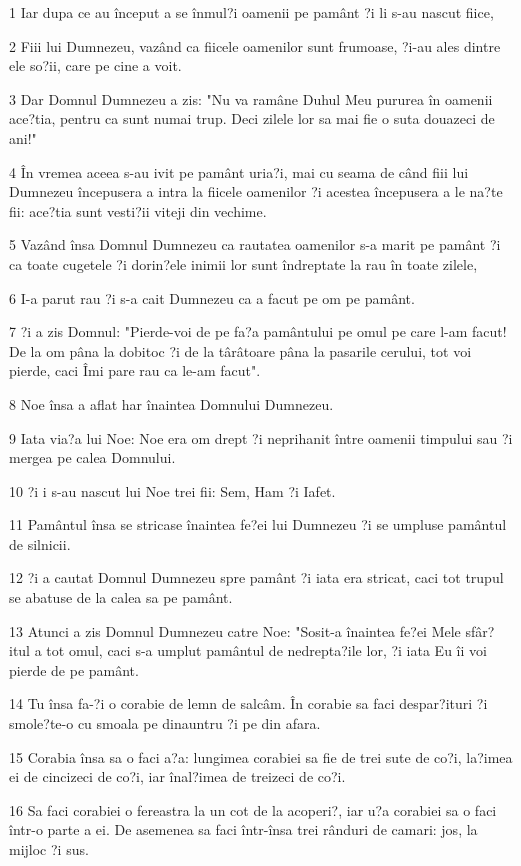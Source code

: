 \par 1 Iar dupa ce au început a se înmul?i oamenii pe pamânt ?i li s-au nascut fiice,
\par 2 Fiii lui Dumnezeu, vazând ca fiicele oamenilor sunt frumoase, ?i-au ales dintre ele so?ii, care pe cine a voit.
\par 3 Dar Domnul Dumnezeu a zis: "Nu va ramâne Duhul Meu pururea în oamenii ace?tia, pentru ca sunt numai trup. Deci zilele lor sa mai fie o suta douazeci de ani!"
\par 4 În vremea aceea s-au ivit pe pamânt uria?i, mai cu seama de când fiii lui Dumnezeu începusera a intra la fiicele oamenilor ?i acestea începusera a le na?te fii: ace?tia sunt vesti?ii viteji din vechime.
\par 5 Vazând însa Domnul Dumnezeu ca rautatea oamenilor s-a marit pe pamânt ?i ca toate cugetele ?i dorin?ele inimii lor sunt îndreptate la rau în toate zilele,
\par 6 I-a parut rau ?i s-a cait Dumnezeu ca a facut pe om pe pamânt.
\par 7 ?i a zis Domnul: "Pierde-voi de pe fa?a pamântului pe omul pe care l-am facut! De la om pâna la dobitoc ?i de la târâtoare pâna la pasarile cerului, tot voi pierde, caci Îmi pare rau ca le-am facut".
\par 8 Noe însa a aflat har înaintea Domnului Dumnezeu.
\par 9 Iata via?a lui Noe: Noe era om drept ?i neprihanit între oamenii timpului sau ?i mergea pe calea Domnului.
\par 10 ?i i s-au nascut lui Noe trei fii: Sem, Ham ?i Iafet.
\par 11 Pamântul însa se stricase înaintea fe?ei lui Dumnezeu ?i se umpluse pamântul de silnicii.
\par 12 ?i a cautat Domnul Dumnezeu spre pamânt ?i iata era stricat, caci tot trupul se abatuse de la calea sa pe pamânt.
\par 13 Atunci a zis Domnul Dumnezeu catre Noe: "Sosit-a înaintea fe?ei Mele sfâr?itul a tot omul, caci s-a umplut pamântul de nedrepta?ile lor, ?i iata Eu îi voi pierde de pe pamânt.
\par 14 Tu însa fa-?i o corabie de lemn de salcâm. În corabie sa faci despar?ituri ?i smole?te-o cu smoala pe dinauntru ?i pe din afara.
\par 15 Corabia însa sa o faci a?a: lungimea corabiei sa fie de trei sute de co?i, la?imea ei de cincizeci de co?i, iar înal?imea de treizeci de co?i.
\par 16 Sa faci corabiei o fereastra la un cot de la acoperi?, iar u?a corabiei sa o faci într-o parte a ei. De asemenea sa faci într-însa trei rânduri de camari: jos, la mijloc ?i sus.
